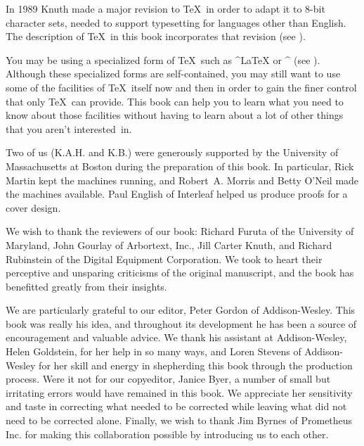 In 1989 Knuth made a major revision to \TeX\ in order to adapt it to
$8$-bit character sets, needed to support typesetting for languages
other than English.  The description of \TeX\ in this book incorporates
that revision (see ).

{\tighten You may be using a specialized form of \TeX\ such as ^{\LaTeX}
or ^{\AMSTeX} (see ).  Although these specialized forms
are self-contained, you may still want to use some of the facilities of
\TeX\ itself now and then in order to gain the finer control that only
\TeX\ can provide.  This book can help you to learn what you need to
know about those facilities without having to learn about a lot of other
things that you aren't interested~in.  \par}

Two of us (K.A.H. and K.B.) were generously supported by the
University of Massachusetts at Boston during the preparation of this
book.  In particular, Rick Martin kept the machines running, and
Robert~A. Morris and Betty O'Neil made the machines available.  Paul
English of Interleaf helped us produce proofs for a cover design.

We wish to thank the reviewers of our book: Richard Furuta of the
University of Maryland, John Gourlay of Arbortext, Inc., Jill Carter
Knuth, and Richard Rubinstein of the Digital Equipment Corporation. We
took to heart their perceptive and unsparing criticisms of the original
manuscript, and the book has benefitted greatly from their insights.

We are particularly grateful to our editor, Peter Gordon of
Addison-Wesley.  This book was really his idea, and throughout its
development he has been a source of encouragement and valuable
advice.  We thank his assistant at Addison-Wesley, Helen Goldstein, for
her help in so many ways, and Loren Stevens of Addison-Wesley for her
skill and energy in shepherding this book through the production
process.  Were it not for our copyeditor, Janice Byer, a number of small
but irritating errors would have remained in this book.  We appreciate
her sensitivity and taste in correcting what needed to be corrected
while leaving what did not need to be corrected alone.  Finally, we wish
to thank Jim Byrnes of Prometheus Inc. for making this collaboration
possible by introducing us to each other.
\baselineskip


